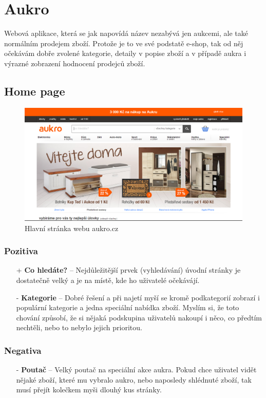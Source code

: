 \section{Aukro}

\label{chap:aukro}

Webová aplikace, která se jak napovídá název nezabývá jen aukcemi, ale také normálním prodejem zboží. Protože je to ve své podstatě e-shop, tak od něj očekávám dobře zvolené kategorie, detaily v popise zboží a v případě aukra i výrazné zobrazení hodnocení prodejců zboží.

\subsection{Home page}
\begin{figure}[h]
    \centering
    \includegraphics[width=1.0\textwidth]{media/aukro/home.png}
    \caption{Hlavní stránka webu aukro.cz}
    \label{fig:aukro:home}
\end{figure}
\subsubsection*{Pozitiva}
\begin{itemize}
    \item[+] \textbf{Co hledáte?} -- Nejdůležitější prvek (vyhledávání) úvodní stránky je dostatečně velký a je na místě, kde ho uživatelé očekávájí.
    \item[-] \textbf{Kategorie} -- Dobré řešení a při najetí myší se kromě podkategorií zobrazí i populární kategorie a jedna speciální nabídka zboží. Myslím si, že toto chování způsobí, že si nějaká podskupina uživatelů nakoupí i něco, co předtím nechtěli, nebo to nebylo jejich prioritou.
\end{itemize}
\subsubsection*{Negativa}
\begin{itemize}
    \item[-] \textbf{Poutač} -- Velký poutač na speciální akce aukra. Pokud chce uživatel vidět nějaké zboží, které mu vybralo aukro, nebo naposledy shlédnuté zboží, tak musí přejít kolečkem myši dlouhý kus stránky.
\end{itemize}


